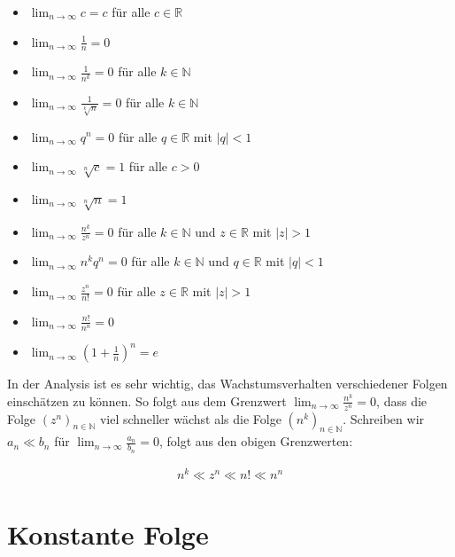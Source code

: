 \documentclass[fontsize=9pt,
               parskip=half-,
               DIV=14,
               listof=chapterentry,
               tocflat]{scrbook}
\begin{document}
\begin{itemize}
\item $\lim _{n\rightarrow \infty }c=c$ für alle $c\in \mathbb {R} $
\item $\lim _{n\rightarrow \infty }{\tfrac {1}{n}}=0$
\item $\lim _{n\rightarrow \infty }{\tfrac {1}{n^{k}}}=0$ für alle $k\in \mathbb {N} $
\item $\lim _{n\rightarrow \infty }{\tfrac {1}{\sqrt[{k}]{n}}}=0$ für alle $k\in \mathbb {N} $
\item $\lim _{n\rightarrow \infty }q^{n}=0$ für alle $q\in \mathbb {R} $ mit $|q|<1$
\item $\lim _{n\rightarrow \infty }{\sqrt[{n}]{c}}=1$ für alle $c>0$
\item $\lim _{n\rightarrow \infty }{\sqrt[{n}]{n}}=1$
\item $\lim _{n\rightarrow \infty }{\tfrac {n^{k}}{z^{n}}}=0$ für alle $k\in \mathbb {N} $ und $z\in \mathbb {R} $ mit $|z|>1$
\item $\lim _{n\rightarrow \infty }n^{k}q^{n}=0$ für alle $k\in \mathbb {N} $ und $q\in \mathbb {R} $ mit $|q|<1$
\item $\lim _{n\rightarrow \infty }{\tfrac {z^{n}}{n!}}=0$ für alle $z\in \mathbb {R} $ mit $|z|>1$
\item $\lim _{n\rightarrow \infty }{\tfrac {n!}{n^{n}}}=0$
\item $\lim _{n\rightarrow \infty }\left(1+{\tfrac {1}{n}}\right)^{n}=e$
\end{itemize}



\begin{hint*}
In der Analysis ist es sehr wichtig, das Wachstumsverhalten verschiedener Folgen einschätzen zu können. So folgt aus dem Grenzwert $\lim _{n\rightarrow \infty }{\tfrac {n^{k}}{z^{n}}}=0$, dass die Folge $(z^{n})_{n\in \mathbb {N} }$ viel schneller wächst als die Folge $(n^{k})_{n\in \mathbb {N} }$. Schreiben wir $a_{n}\ll b_{n}$ für $\lim _{n\to \infty }{\tfrac {a_{n}}{b_{n}}}=0$, folgt aus den obigen Grenzwerten:

\begin{align*}
n^{k}\ll z^{n}\ll n!\ll n^{n}
\end{align*}

\end{hint*}

\clearpage

\section{Konstante Folge}
\end{document}
